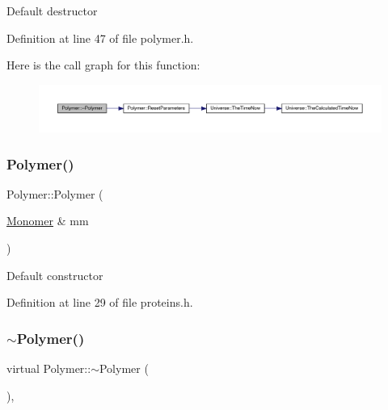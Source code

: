 Default destructor 

Definition at line 47 of file polymer.\+h.

Here is the call graph for this function\+:\nopagebreak
\begin{figure}[H]
\begin{center}
\leavevmode
\includegraphics[width=350pt]{class_polymer_aac2b3983f375a5691c7d5ca1a79594d5_cgraph}
\end{center}
\end{figure}
\mbox{\label{class_polymer_ae77454a3908652e4df6a26b9cac509a5}} 
\subsubsection{\texorpdfstring{Polymer()}{Polymer()}\hspace{0.1cm}{\footnotesize\ttfamily [14/14]}}
{\footnotesize\ttfamily Polymer\+::\+Polymer (\begin{DoxyParamCaption}\item[{\hyperlink{class_monomer}{Monomer} \&}]{mm }\end{DoxyParamCaption})\hspace{0.3cm}{\ttfamily [inline]}}

Default constructor 

Definition at line 29 of file proteins.\+h.

\mbox{\label{class_polymer_aac2b3983f375a5691c7d5ca1a79594d5}} 
\subsubsection{\texorpdfstring{$\sim$\+Polymer()}{~Polymer()}\hspace{0.1cm}{\footnotesize\ttfamily [11/11]}}
{\footnotesize\ttfamily virtual Polymer\+::$\sim$\+Polymer (\begin{DoxyParamCaption}{ }\end{DoxyParamCaption})\hspace{0.3cm}{\ttfamily [inline]}, {\ttfamily [virtual]}}

